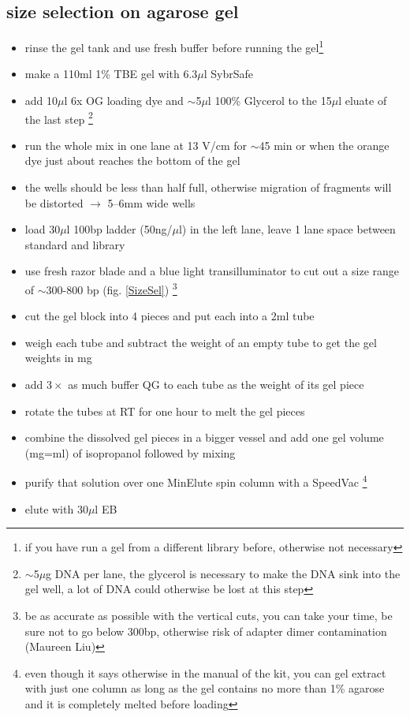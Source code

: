 \subsection
{size selection on agarose gel}\label{sizeSelection}
\begin{itemize}
\item rinse the gel tank and use fresh buffer before running the gel\footnote{if you have run a gel from a different library before, otherwise not necessary} 
\item make a 110ml 1\% TBE gel with 6.3$\mu$l SybrSafe
\item add 10$\mu$l 6x OG loading dye and $\sim$5$\mu$l 100\% Glycerol to the 15$\mu$l eluate of the last step \footnote{$\sim$5$\mu$g DNA per lane, the glycerol is necessary to make the DNA sink into the gel well, a lot of DNA could otherwise be lost at this step}
\item run the whole mix in one lane at 13 V/cm for $\sim$45 min or when the orange dye just about reaches the bottom of the gel
\item the wells should be less than half full, otherwise migration of fragments will be distorted $\rightarrow$ 5--6mm wide wells
\item load 30$\mu$l 100bp ladder (50ng/$\mu$l) in the left lane, leave 1 lane space between standard and library
\item use fresh razor blade and a blue light transilluminator to cut out a size range of $\sim$300-800 bp (fig. \ref{SizeSel}) \footnote{be as accurate as possible with the vertical cuts, you can take your time, be sure not to go below 300bp, otherwise risk of adapter dimer contamination (Maureen Liu)}
\item cut the gel block into 4 pieces and put each into a 2ml tube
\item weigh each tube and subtract the weight of an empty tube to get the gel weights in mg
\item add $3 \times$ as much buffer QG to each tube as the weight of its gel piece
\item rotate the tubes at RT for one hour to melt the gel pieces 
\item combine the dissolved gel pieces in a bigger vessel and add one gel volume (mg=ml) of isopropanol followed by mixing
\item purify that solution over one MinElute spin column with a SpeedVac \footnote{even though it says otherwise in the manual of the kit, you can gel extract with just one column as long as the gel contains no more than 1\% agarose and it is completely melted before loading}
\item elute with 30$\mu$l EB
\end{itemize}

